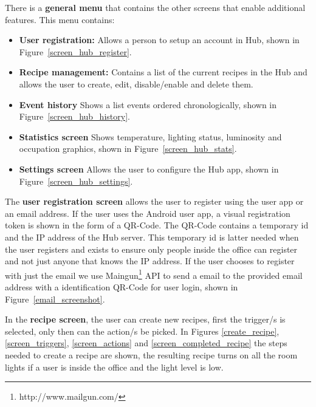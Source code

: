 There is a \textbf{general menu} that contains the other screens that enable additional features. This menu contains:
\begin{itemize}
  \item \textbf{User registration:} Allows a person to setup an account in Hub, shown in Figure~\ref{screen_hub_register}. 
  \item \textbf{Recipe management:} Contains a list of the current recipes in the Hub and allows the user to create, edit, disable/enable and delete them.
  
  \item \textbf{Event history} Shows a list events ordered chronologically, shown in Figure~\ref{screen_hub_history}.  
  
  \item \textbf{Statistics screen} Shows temperature, lighting status, luminosity and occupation graphics, shown in Figure~\ref{screen_hub_stats}.   
  
  \item \textbf{Settings screen} Allows the user to configure the Hub app, shown in Figure~\ref{screen_hub_settings}.   
\end{itemize}



The \textbf{user registration screen} allows the user to register using the user app or an email address.
If the user uses the Android user app, a visual registration token is shown in the form of a QR-Code. The QR-Code contains a temporary id and the IP address of the Hub server. This temporary id is latter needed when the user registers and exists to ensure only people inside the office can register and not just anyone that knows the IP address. If the user chooses to register with just the email we use Maingun\footnote{http://www.mailgun.com/} API to send a email to the provided email address with a identification QR-Code for user login, shown in Figure~\ref{email_screenshot}.

In the \textbf{recipe screen}, the user can create new recipes, first the trigger/s is selected, only then can the action/s be picked. In Figures \ref{create_recipe}, \ref{screen_triggers}, \ref{screen_actions} and \ref{screen_completed_recipe} the steps needed to create a recipe are shown, the resulting recipe turns on all the room lights if a user is inside the office and the light level is low. 

